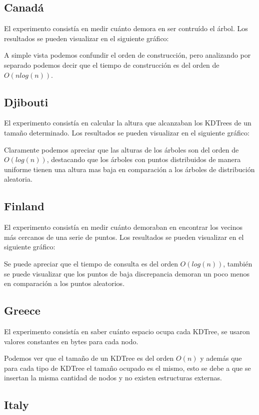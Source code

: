 \documentclass[12pt,letterpaper, margin = 3cm]{article}
\begin{document}
\subsection{Canadá}
El experimento consistía en medir cuánto demora en ser contruído el árbol. Los resultados se pueden visualizar en el siguiente gráfico:

A simple vista podemos confundir el orden de construcción, pero analizando por separado podemos decir que el tiempo de construcción es del orden de $O(n log(n))$.


\newpage
\subsection{Djibouti}
El experimento consistía en calcular la altura que alcanzaban los KDTrees de un tamaño determinado. Los resultados se pueden visualizar en el siguiente gráfico:

Claramente podemos apreciar que las alturas de los árboles son del orden de $O(log(n))$, destacando que los árboles con puntos distribuidos de manera uniforme tienen una altura mas baja en comparación a los árboles de distribución aleatoria.
\newpage
\subsection{Finland}
El experimento consistía en medir cuánto demoraban en encontrar los vecinos más cercanos de una serie de puntos. Los resultados se pueden visualizar en el siguiente gráfico:


Se puede apreciar que el tiempo de consulta es del orden $O(log(n))$, también se puede visualizar que los puntos de baja discrepancia demoran un poco menos en comparación a los puntos aleatorios.

\newpage
\subsection{Greece} 
El experimento consistía en saber cuánto espacio ocupa cada KDTree, se usaron valores constantes en bytes para cada nodo. 

Podemos ver que el tamaño de un KDTree es del orden $O(n)$ y además que para cada tipo de KDTree el tamaño ocupado es el mismo, esto se debe a que se insertan la misma cantidad de nodos y no existen estructuras externas.

\subsection{Italy}
\end{document}
